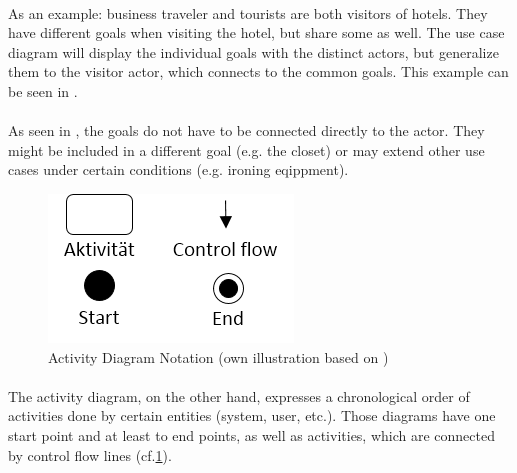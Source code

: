\paragraph{} As an example: business traveler and tourists are both visitors of hotels. They have different goals when visiting the hotel, but share some as well. The use case diagram will display the individual goals with the distinct actors, but generalize them to the visitor actor, which connects to the common goals. This example can be seen in . 

\paragraph{} As seen in , the goals do not have to be connected directly to the actor. They might be included in a different goal (e.g. the closet) or may extend other use cases under certain conditions (e.g. ironing eqippment).
 
\begin{figure}[H]
    \centering
    \includegraphics[scale=0.9]{img/adSymb.png}
    \caption[Activity Diagram Notation]{Activity Diagram Notation (own illustration based on \cite[160]{Pohl.2007})}
    \label{fig:adSymb}
\end{figure}

\paragraph{} The activity diagram, on the other hand, expresses a chronological order of activities done by certain entities (system, user, etc.). Those diagrams have one start point and at least to end points, as well as activities, which are connected by control flow lines (cf.\cref{fig:adSymb}).

